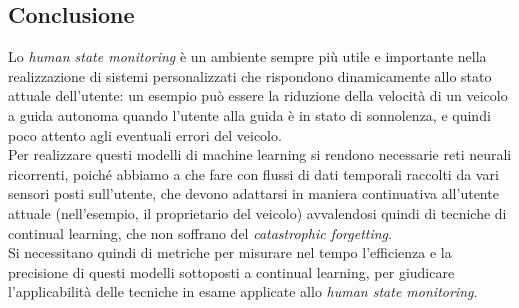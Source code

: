 \subsection*{Conclusione} Lo \textit{human state monitoring} è un ambiente sempre più utile e importante nella realizzazione di sistemi personalizzati che rispondono dinamicamente allo stato attuale dell'utente: un esempio può essere la riduzione della velocità di un veicolo a guida autonoma quando l'utente alla guida è in stato di sonnolenza, e quindi poco attento agli eventuali errori del veicolo.\\
Per realizzare questi modelli di machine learning si rendono necessarie reti neurali ricorrenti, poiché abbiamo a che fare con flussi di dati temporali raccolti da vari sensori posti sull'utente, che devono adattarsi in maniera continuativa all'utente attuale (nell'esempio, il proprietario del veicolo) avvalendosi quindi di tecniche di continual learning, che non soffrano del \textit{catastrophic forgetting}.\\
Si necessitano quindi di metriche per misurare nel tempo l'efficienza e la precisione di questi modelli sottoposti a continual learning, per giudicare l'applicabilità delle tecniche in esame applicate allo \textit{human state monitoring}.
